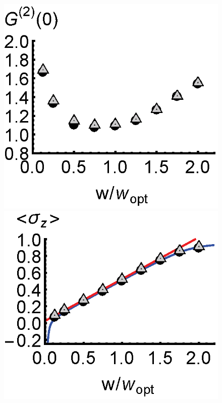 \documentclass[aps,
twocolumn,
superscriptaddress,groupedaddress]{revtex4}
\begin{document}
\begin{figure}
\begin{center}
	\hspace{-5.0mm} \includegraphics[scale =0.38] {N40SuperradianceG2.eps}\\ \vspace{0mm}
	\includegraphics[scale =0.38] {N40CrossoverSZ.eps}

\end{center}
\end{figure}
\end{document}
